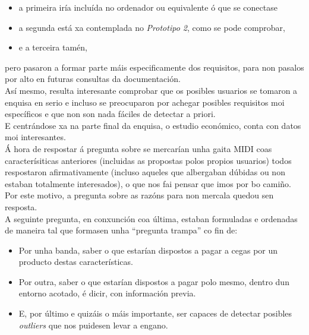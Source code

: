   \begin{itemize}
   \item a primeira iría incluída no ordenador ou equivalente ó que se
         conectase
   \item a segunda está xa contemplada no \textit{Prototipo 2}, como se pode
         comprobar,
   \item e a terceira tamén,
  \end{itemize}

  pero pasaron a formar parte máis especificamente dos requisitos, para non
  pasalos por alto en futuras consultas da documentación. \\

  Así mesmo, resulta interesante comprobar que os posibles usuarios se tomaron
  a enquisa en serio e incluso se preocuparon por achegar posibles requisitos
  moi específicos e que non son nada fáciles de detectar a priori. \\

  E centrándose xa na parte final da enquisa, o estudio económico, conta con
  datos moi interesantes. \\

  Á hora de respostar á pregunta sobre se mercarían unha gaita MIDI coas
  caracterísiticas anteriores (incluidas as propostas polos propios usuarios)
  todos respostaron afirmativamente (incluso aqueles que albergaban dúbidas ou
  non estaban totalmente interesados), o que nos fai pensar que imos por bo
  camiño. \\

  Por este motivo, a pregunta sobre as razóns para non mercala quedou sen
  resposta. \\

  A seguinte pregunta, en conxunción coa última, estaban formuladas e ordenadas
  de maneira tal que formasen unha ``pregunta trampa'' co fin de:

  \begin{itemize}
   \item Por unha banda, saber o que estarían dispostos a pagar a cegas por un
         producto destas características.
   \item Por outra, saber o que estarían dispostos a pagar polo mesmo, dentro
         dun entorno acotado, é dicir, con información previa.
   \item E, por último e quizáis o máis importante, ser capaces de detectar
         posibles \textit{outliers} que nos puidesen levar a engano.
  \end{itemize}

